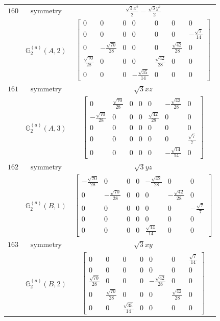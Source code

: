 \documentclass[fleqn,8pt,landscape]{jsarticle}
\begin{document}
\begin{longtable}{ccc}
$ 160 $ & $ \text{symmetry} $ & $ \frac{\sqrt{3} x^{2}}{2} - \frac{\sqrt{3} y^{2}}{2} $ \\
$  $ & $ \mathbb{G}_{2}^{(a)}(A,2) $ & $ \begin{bmatrix} 0 & 0 & 0 & 0 & 0 & 0 & 0 \\ 0 & 0 & 0 & 0 & 0 & 0 & - \frac{\sqrt{7}}{14} \\ 0 & - \frac{\sqrt{70}}{28} & 0 & 0 & 0 & \frac{\sqrt{42}}{28} & 0 \\ \frac{\sqrt{70}}{28} & 0 & 0 & 0 & \frac{\sqrt{42}}{28} & 0 & 0 \\ 0 & 0 & 0 & - \frac{\sqrt{35}}{14} & 0 & 0 & 0 \end{bmatrix} $ \\ \hline
$ 161 $ & $ \text{symmetry} $ & $ \sqrt{3} x z $ \\
$  $ & $ \mathbb{G}_{2}^{(a)}(A,3) $ & $ \begin{bmatrix} 0 & \frac{\sqrt{70}}{28} & 0 & 0 & 0 & - \frac{\sqrt{42}}{28} & 0 \\ - \frac{\sqrt{70}}{28} & 0 & 0 & 0 & \frac{\sqrt{42}}{28} & 0 & 0 \\ 0 & 0 & 0 & 0 & 0 & 0 & 0 \\ 0 & 0 & 0 & 0 & 0 & 0 & \frac{\sqrt{7}}{7} \\ 0 & 0 & 0 & 0 & 0 & - \frac{\sqrt{14}}{14} & 0 \end{bmatrix} $ \\ \hline
$ 162 $ & $ \text{symmetry} $ & $ \sqrt{3} y z $ \\
$  $ & $ \mathbb{G}_{2}^{(a)}(B,1) $ & $ \begin{bmatrix} - \frac{\sqrt{70}}{28} & 0 & 0 & 0 & - \frac{\sqrt{42}}{28} & 0 & 0 \\ 0 & - \frac{\sqrt{70}}{28} & 0 & 0 & 0 & - \frac{\sqrt{42}}{28} & 0 \\ 0 & 0 & 0 & 0 & 0 & 0 & - \frac{\sqrt{7}}{7} \\ 0 & 0 & 0 & 0 & 0 & 0 & 0 \\ 0 & 0 & 0 & 0 & \frac{\sqrt{14}}{14} & 0 & 0 \end{bmatrix} $ \\ \hline
$ 163 $ & $ \text{symmetry} $ & $ \sqrt{3} x y $ \\
$  $ & $ \mathbb{G}_{2}^{(a)}(B,2) $ & $ \begin{bmatrix} 0 & 0 & 0 & 0 & 0 & 0 & \frac{\sqrt{7}}{14} \\ 0 & 0 & 0 & 0 & 0 & 0 & 0 \\ \frac{\sqrt{70}}{28} & 0 & 0 & 0 & - \frac{\sqrt{42}}{28} & 0 & 0 \\ 0 & \frac{\sqrt{70}}{28} & 0 & 0 & 0 & \frac{\sqrt{42}}{28} & 0 \\ 0 & 0 & \frac{\sqrt{35}}{14} & 0 & 0 & 0 & 0 \end{bmatrix} $ \\ \hline

\end{longtable}
\end{document}
